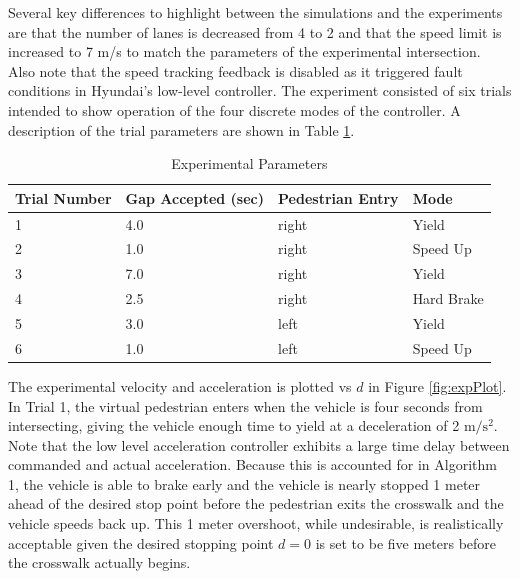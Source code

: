 \documentclass[letterpaper, 10 pt, conference]{ieeeconf}  %
\begin{document}
Several key differences to highlight between the simulations and the experiments are that the number of lanes is decreased from 4 to 2 and that the speed limit is increased to 7 m/s to match the parameters of the experimental intersection. Also note that the speed tracking feedback is disabled as it triggered fault conditions in Hyundai's low-level controller. The experiment consisted of six trials intended to show operation of the four discrete modes of the controller. A description of the trial parameters are shown in Table \ref{tb:expparams2}. 


\begin{table}[h]
\footnotesize
\begin{center}
\caption{Experimental Parameters}\label{tb:expparams2}
\begin{tabular}{llll}
Trial Number & Gap Accepted (sec) & Pedestrian Entry & Mode\\\hline\hline
1 & 4.0 & right &  Yield\\ 
2 & 1.0 & right &  Speed Up\\ 
3 & 7.0 & right &  Yield\\ 
4 & 2.5 & right &  Hard Brake\\ 
5 & 3.0 & left  &  Yield \\ 
6 & 1.0 & left  &  Speed Up\\\hline
\end{tabular}
\end{center}
\end{table}

The experimental velocity and acceleration is plotted vs $d$ in 
Figure \ref{fig:expPlot}. In Trial 1, the virtual pedestrian enters when the vehicle is four seconds from intersecting, giving the vehicle enough time to yield at a deceleration of 2 $\mathrm{m/s^2}$. Note that the low level acceleration controller exhibits a large time delay between commanded and actual acceleration. Because this is accounted for in Algorithm 1, the vehicle is able to brake early and the vehicle is nearly stopped 1 meter ahead of the desired stop point before the pedestrian exits the crosswalk and the vehicle speeds back up. This 1 meter overshoot, while undesirable, is realistically acceptable given the desired stopping point $d=0$ is set to be five meters before the crosswalk actually begins. 
\end{document}
